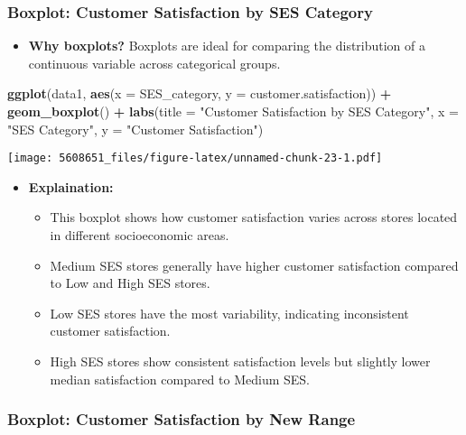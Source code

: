\documentclass[
]{article}
\newenvironment{Shaded}{\begin{snugshade}}{\end{snugshade}}
\newcommand{\AttributeTok}[1]{\textcolor[rgb]{0.13,0.29,0.53}{#1}}
\newcommand{\FunctionTok}[1]{\textcolor[rgb]{0.13,0.29,0.53}{\textbf{#1}}}
\newcommand{\NormalTok}[1]{#1}
\newcommand{\SpecialCharTok}[1]{\textcolor[rgb]{0.81,0.36,0.00}{\textbf{#1}}}
\newcommand{\StringTok}[1]{\textcolor[rgb]{0.31,0.60,0.02}{#1}}
\providecommand{\tightlist}{%
  \setlength{\itemsep}{0pt}\setlength{\parskip}{0pt}}
\begin{document}
\subsubsection{Boxplot: Customer Satisfaction by SES
Category}\label{boxplot-customer-satisfaction-by-ses-category}

\begin{itemize}
\tightlist
\item
  \textbf{Why boxplots?} Boxplots are ideal for comparing the
  distribution of a continuous variable across categorical groups.
\end{itemize}

\begin{Shaded}
\begin{Highlighting}[]
\FunctionTok{ggplot}\NormalTok{(data1, }\FunctionTok{aes}\NormalTok{(}\AttributeTok{x =}\NormalTok{ SES\_category, }\AttributeTok{y =}\NormalTok{ customer.satisfaction)) }\SpecialCharTok{+}
  \FunctionTok{geom\_boxplot}\NormalTok{() }\SpecialCharTok{+}
  \FunctionTok{labs}\NormalTok{(}\AttributeTok{title =} \StringTok{"Customer Satisfaction by SES Category"}\NormalTok{,}
       \AttributeTok{x =} \StringTok{"SES Category"}\NormalTok{,}
       \AttributeTok{y =} \StringTok{"Customer Satisfaction"}\NormalTok{)}
\end{Highlighting}
\end{Shaded}

\texttt{[image: 5608651\_files/figure-latex/unnamed-chunk-23-1.pdf]}

\begin{itemize}
\tightlist
\item
  \textbf{Explaination:}

  \begin{itemize}
  \tightlist
  \item
    This boxplot shows how customer satisfaction varies across stores
    located in different socioeconomic areas.
  \item
    Medium SES stores generally have higher customer satisfaction
    compared to Low and High SES stores.
  \item
    Low SES stores have the most variability, indicating inconsistent
    customer satisfaction.
  \item
    High SES stores show consistent satisfaction levels but slightly
    lower median satisfaction compared to Medium SES.
  \end{itemize}
\end{itemize}

\subsubsection{Boxplot: Customer Satisfaction by New
Range}\label{boxplot-customer-satisfaction-by-new-range}
\end{document}
